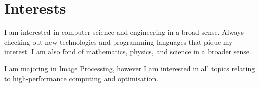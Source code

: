 \documentclass[letterpaper]{twentysecondcv} %
\begin{document}







\makeprofile %


\section{Interests}

I am interested in computer science and engineering in a broad sense. Always
checking out new technologies and programming languages that pique my interest.
I am also fond of mathematics, physics, and science in a broader sense.

I am majoring in Image Processing, however I am interested in all topics
relating to high-performance computing and optimisation.

\end{document}
